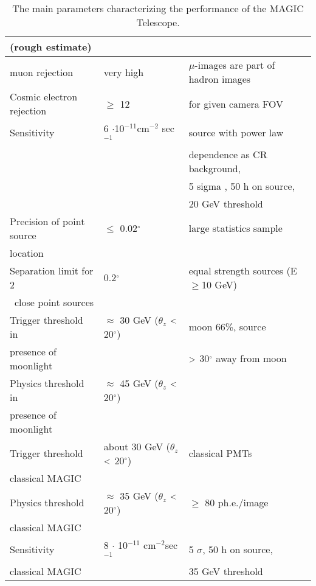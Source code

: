 \begin{table}
{\begin{tabular}{|l|l|l|}
                        (rough estimate)\\
\hline
muon rejection & very high &  $\mu$-images are part of
hadron images\\ \hline
Cosmic electron rejection & $\geq$ 12  & for given camera FOV \\ \hline
Sensitivity & 6 $\cdot $10$^{-11}$cm$^{-2}$ sec$^{-1}$ & source with power
law \\ 
&  & dependence as CR background, \\ 
&  & 5 sigma , 50 h on source, \\ 
&  & 20 GeV threshold \\ \hline
Precision of point source & $\leq $ 0.02$^{\circ }$ & large statistics sample
\\ 
location &  &  \\ \hline
Separation limit for 2 & 0.2$^{\circ }$ & equal strength
sources (E$\geq$10 GeV)\\\ 
close point sources &  &  \\ \hline
Trigger threshold in & $\approx $ 30 GeV ($\theta _{z}$ $\rm{<}$ 20$%
^{\circ }$) & moon 66\%, source \\ 
presence of moonlight &  & $\rm{>}$ 30$^{\circ }$ away from moon \\ 
\hline
Physics threshold in & $\approx $ 45 GeV ($\theta _{z}$ $\rm{<}$ 20$%
^{\circ }$) &  \\ 
presence of moonlight &  &  \\ \hline
Trigger threshold & about 30 GeV ($\theta _{z}$ $\rm{<}$ 20$^{\circ }$)
& classical PMTs \\ 
classical MAGIC &  &  \\ \hline
Physics threshold & $\approx $ 35 GeV ($\theta _{z}$ $\rm{<}$ 20$%
^{\circ }$) & $\geq $ 80 ph.e./image \\ 
classical MAGIC &  &  \\ \hline
Sensitivity & 8 $\cdot $ 10$^{-11}$ cm$^{-2}$sec$^{-1}$ & 5 $\sigma $, 50 h
on source, \\ 
classical MAGIC &  & 35 GeV threshold \\ \hline
\end{tabular}
}
\caption{
\label{tab-perform} The main parameters characterizing the performance of the
MAGIC Telescope.}
\end{table}

\newpage
\begin{figure}[t]
\leavevmode
\centering
\epsfxsize=14cm
\end{figure}
\newpage

